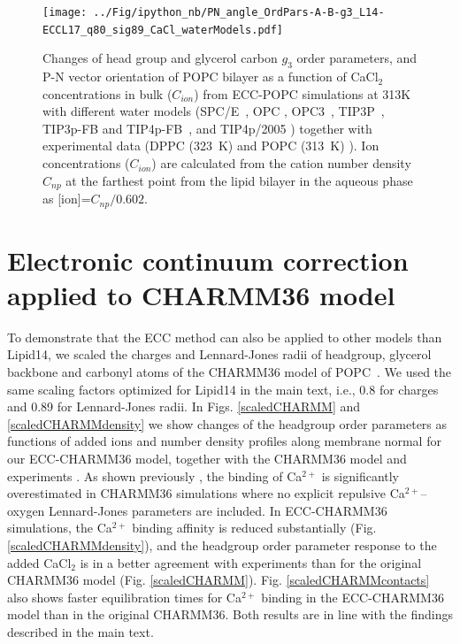 \documentclass[journal=jpcbfk]{achemso}
\begin{document}
\begin{figure}[!hp]
  \centering
  \texttt{[image: ../Fig/ipython\_nb/PN\_angle\_OrdPars-A-B-g3\_L14-ECCL17\_q80\_sig89\_CaCl\_waterModels.pdf]}
  \caption{\label{fig:ordPars_waterModels}
    Changes of head group and glycerol carbon $g_3$ order parameters, and P-N vector orientation of POPC bilayer
    as a function of CaCl$_2$ concentrations in bulk ($C_{ion}$) from ECC-POPC simulations at 313K with different
    water models (SPC/E~\cite{Berendsen1987}, OPC \cite{Izadi14}, OPC3~\cite{Izadi16}, TIP3P~\cite{jorgensen83}, TIP3p-FB and TIP4p-FB~\cite{Wang2014}, and TIP4p/2005 \cite{Abascal2005})
    together with experimental data (DPPC (323~K) \cite{akutsu81} and POPC (313~K) \cite{altenbach84}). 
    Ion concentrations ($C_{ion}$) are calculated from the cation number density $C_{np}$
    at the farthest point from the lipid bilayer in the aqueous phase as [ion]=$C_{np}/0.602$.
  }
\end{figure}

\newpage
\section{Electronic continuum correction applied to CHARMM36 model}
To demonstrate that the ECC method can also be applied to other models than Lipid14,
we scaled the charges and Lennard-Jones radii of headgroup, glycerol backbone and
carbonyl atoms of the CHARMM36 model of POPC~\cite{klauda10}. We used the
same scaling factors optimized for Lipid14 in the main text, i.e., 0.8 for charges and 0.89 for Lennard-Jones
radii. In Figs. \ref{scaledCHARMM} and \ref{scaledCHARMMdensity} we show
changes of the headgroup order parameters as functions of added ions
and number density profiles along membrane normal for our ECC-CHARMM36 model,
together with the CHARMM36 model \cite{catte16,charmmPOPC450mMCaClfiles}
and experiments \cite{akutsu81,altenbach84}. As shown previously \cite{catte16},
the binding of Ca$^{2+}$ is significantly overestimated in CHARMM36 simulations
where no explicit repulsive Ca$^{2+}$--oxygen Lennard-Jones parameters are included.
In ECC-CHARMM36 simulations, the Ca$^{2+}$ binding affinity 
is reduced substantially (Fig. \ref{scaledCHARMMdensity}), and the headgroup order parameter response to the added CaCl$_2$
is in a better agreement with experiments than for the original CHARMM36 model (Fig. \ref{scaledCHARMM}).
Fig. \ref{scaledCHARMMcontacts} also shows faster equilibration times
for Ca$^{2+}$ binding in the ECC-CHARMM36 model than in the original CHARMM36.
Both results are in line with the findings described in the main text.
\end{document}
